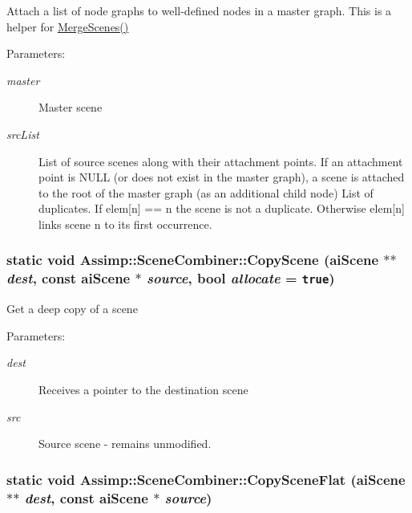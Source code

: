 Attach a list of node graphs to well-defined nodes in a master graph. This is a helper for \hyperlink{class_assimp_1_1_scene_combiner_b399fdea5846bc969a021a39f5a11276}{MergeScenes()}

\begin{Desc}
\item[Parameters:]
\begin{description}
\item[{\em master}]Master scene \item[{\em srcList}]List of source scenes along with their attachment points. If an attachment point is NULL (or does not exist in the master graph), a scene is attached to the root of the master graph (as an additional child node)  List of duplicates. If elem\mbox{[}n\mbox{]} == n the scene is not a duplicate. Otherwise elem\mbox{[}n\mbox{]} links scene n to its first occurrence. \end{description}
\end{Desc}
\hypertarget{class_assimp_1_1_scene_combiner_855a472e4848d737ef1ff091363f3a7c}{
\subsubsection[CopyScene]{\setlength{\rightskip}{0pt plus 5cm}static void Assimp::SceneCombiner::CopyScene ({\bf aiScene} $\ast$$\ast$ {\em dest}, \/  const {\bf aiScene} $\ast$ {\em source}, \/  bool {\em allocate} = {\tt true})}}
\label{class_assimp_1_1_scene_combiner_855a472e4848d737ef1ff091363f3a7c}


Get a deep copy of a scene

\begin{Desc}
\item[Parameters:]
\begin{description}
\item[{\em dest}]Receives a pointer to the destination scene \item[{\em src}]Source scene - remains unmodified. \end{description}
\end{Desc}
\hypertarget{class_assimp_1_1_scene_combiner_fd836d513bc02da4c40d1432bf687f3e}{
\subsubsection[CopySceneFlat]{\setlength{\rightskip}{0pt plus 5cm}static void Assimp::SceneCombiner::CopySceneFlat ({\bf aiScene} $\ast$$\ast$ {\em dest}, \/  const {\bf aiScene} $\ast$ {\em source})}}
\label{class_assimp_1_1_scene_combiner_fd836d513bc02da4c40d1432bf687f3e}


